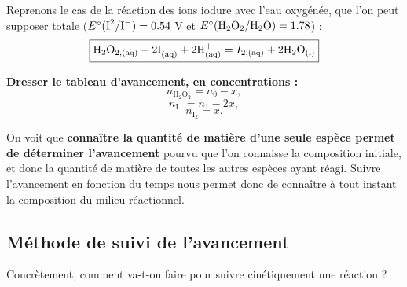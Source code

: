 \documentclass[11pt,a4paper]{report}
\begin{document}
Reprenons le cas de la réaction des ions iodure avec l'eau oxygénée, que l'on peut supposer totale ($E\degree(\text{I}^2/\text{I}^-) = 0.54$ V et $E\degree(\text{H}_2\text{O}_{2}/\text{H}_2\text{O}) = 1.78$) :
\begin{equation}
 	\boxed{\text{H}_2\text{O}_{2,\text{(aq)}} + 2 \text{I}^{-}_\text{(aq)} + 2 \text{H}^+_			\text{(aq)} = I_{2,\text{(aq)}} + 2\text{H}_2\text{O}_\text{(l)}}\\
\end{equation}

\textbf{Dresser le tableau d'avancement, en concentrations :}
\begin{equation}
	n_{\text{H}_2\text{O}_2} = n_0 - x,
\end{equation}
\begin{equation}
	n_{\text{I}^-} = n_1 - 2x,
\end{equation}
\begin{equation}
 	n_{\text{I}_2} = x.
\end{equation}

On voit que \textbf{connaître la quantité de matière d'une seule espèce permet de déterminer l'avancement} pourvu que l'on connaisse la composition initiale, et donc la quantité de matière de toutes les autres espèces ayant réagi. Suivre l'avancement en fonction du temps nous permet donc de connaître à tout instant la composition du milieu réactionnel.

\newpage
\subsection{Méthode de suivi de l'avancement}

Concrètement, comment va-t-on faire pour suivre cinétiquement une réaction ?\\
\end{document}

